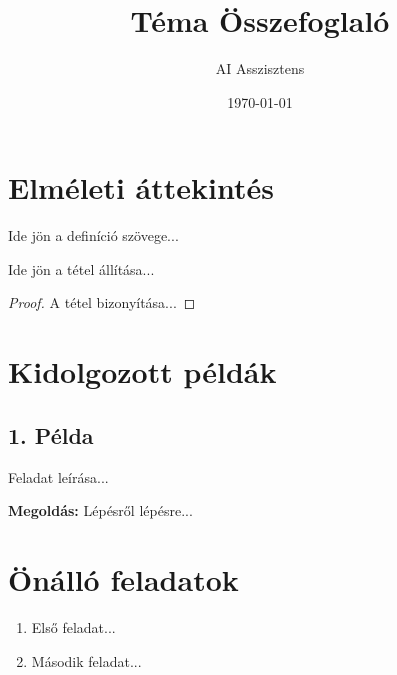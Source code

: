 \documentclass[a4paper,12pt]{article}
\title{Téma Összefoglaló}
\author{AI Asszisztens}
\date{\today}
\begin{document}
\maketitle

\section{Elméleti áttekintés}

\begin{tcolorbox}[colback=blue!5!white,colframe=blue!75!black,title=Definíció]
Ide jön a definíció szövege...
\end{tcolorbox}

\begin{tcolorbox}[colback=green!5!white,colframe=green!75!black,title=Tétel]
Ide jön a tétel állítása...
\end{tcolorbox}

\begin{proof}
A tétel bizonyítása...
\end{proof}

\section{Kidolgozott példák}

\subsection{1. Példa}
Feladat leírása...

\medskip
\textbf{Megoldás:}
Lépésről lépésre...

\section{Önálló feladatok}
\begin{enumerate}
    \item Első feladat...
    \item Második feladat...
\end{enumerate}
\end{document}
